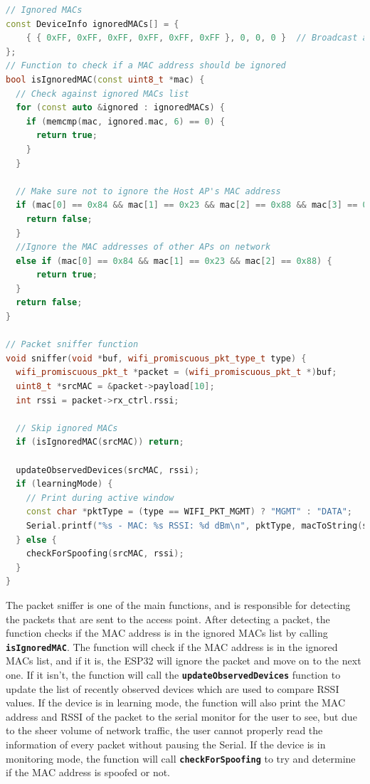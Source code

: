 \documentclass[letterpaper, 11pt]{article}
\begin{document}
\newpage
\begin{lstlisting}[language=C++, caption=Packet Sniffer and MAC Filter, label=lst:main_code]
// Ignored MACs
const DeviceInfo ignoredMACs[] = {
    { { 0xFF, 0xFF, 0xFF, 0xFF, 0xFF, 0xFF }, 0, 0, 0 }  // Broadcast address
};
// Function to check if a MAC address should be ignored
bool isIgnoredMAC(const uint8_t *mac) {
  // Check against ignored MACs list
  for (const auto &ignored : ignoredMACs) {
    if (memcmp(mac, ignored.mac, 6) == 0) {
      return true;
    }
  }

  // Make sure not to ignore the Host AP's MAC address
  if (mac[0] == 0x84 && mac[1] == 0x23 && mac[2] == 0x88 && mac[3] == 0x7B && mac[4] == 0x90 && mac[5] == 0xA0) { 
    return false;
  } 
  //Ignore the MAC addresses of other APs on network
  else if (mac[0] == 0x84 && mac[1] == 0x23 && mac[2] == 0x88) {
      return true;
  }
  return false;
}

// Packet sniffer function
void sniffer(void *buf, wifi_promiscuous_pkt_type_t type) {
  wifi_promiscuous_pkt_t *packet = (wifi_promiscuous_pkt_t *)buf;
  uint8_t *srcMAC = &packet->payload[10];
  int rssi = packet->rx_ctrl.rssi;

  // Skip ignored MACs
  if (isIgnoredMAC(srcMAC)) return;

  updateObservedDevices(srcMAC, rssi);
  if (learningMode) {
    // Print during active window
    const char *pktType = (type == WIFI_PKT_MGMT) ? "MGMT" : "DATA";
    Serial.printf("%s - MAC: %s RSSI: %d dBm\n", pktType, macToString(srcMAC).c_str(), rssi);
  } else {
    checkForSpoofing(srcMAC, rssi);
  }
}
\end{lstlisting}
The packet sniffer is one of the main functions, and is responsible for detecting the packets that are sent to the access point. After detecting a packet, the function checks if the MAC address
is in the ignored MACs list by calling \textbf{\lstinline[]|isIgnoredMAC|}. The function will check if the MAC address is in the ignored MACs list, and if it is, the ESP32 will ignore the packet 
and move on to the next one. If it isn't, the function will call the \textbf{\lstinline[]|updateObservedDevices|} function to update the list of recently observed devices which are used to compare 
RSSI values. If the device is in learning mode, the function will also print the MAC address and RSSI of the packet to the serial monitor for the user to see, but due to the sheer volume of network 
traffic, the user cannot properly read the information of every packet without pausing the Serial. If the device is in monitoring mode, the function will call \textbf{\lstinline[]|checkForSpoofing|}  
to try and determine if the MAC address is spoofed or not.
\end{document}
